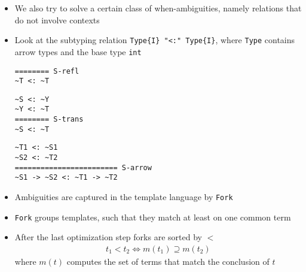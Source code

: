 \documentclass{beamer}
\begin{document}
\begin{frame}
\begin{itemize}
\item We also try to solve a certain class of when-ambiguities, namely
  relations that do not involve contexts
\item Look at the subtyping relation \verb|Type{I} "<:" Type{I}|,
  where \verb|Type| contains arrow types and the base type \verb|int|
  \begin{minipage}[b]{.4\linewidth}
\begin{lstlisting}
======== S-refl
~T <: ~T
\end{lstlisting}
  \end{minipage}
  \begin{minipage}[b]{.4\linewidth}
\begin{lstlisting}
~S <: ~Y
~Y <: ~T
======== S-trans
~S <: ~T
\end{lstlisting}
  \end{minipage}
  \begin{lstlisting}
~T1 <: ~S1
~S2 <: ~T2
======================== S-arrow
~S1 -> ~S2 <: ~T1 -> ~T2
  \end{lstlisting}
\end{itemize}

\framebreak{}

\begin{itemize}
\item Ambiguities are captured in the template language by \verb|Fork|
\item \verb|Fork| groups templates, such that they match at least on
  one common term
\item After the last optimization step forks are sorted by $<$
  \begin{align}
    t_1 < t_2 \iff m(t_1) \supseteq m(t_2)
  \end{align}
  where $m(t)$ computes the set of terms that match the conclusion of $t$
\end{itemize}
\end{frame}

\renewcommand*\selectConstraintGeneration{orange}
\renewcommand*\selectConstraintGeneration{}
\end{document}
